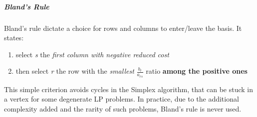                 \subparagraph{Bland's Rule}
                    Bland's rule dictate a choice for rows and columns to enter/leave the basis. It states:
                    \begin{enumerate}
                        \item select \emph{s} the \textit{first column with negative reduced cost}
                        \item then select \emph{r} the row with the \textit{smallest} $\frac{b_r}{a_{rs}}$ ratio \textbf{among the positive ones}
                    \end{enumerate}
                    This simple criterion avoids cycles in the Simplex algorithm, that can be stuck in a vertex for some degenerate LP problems. In practice, due to the additional complexity added and the rarity of such problems, Bland's rule is never used.

